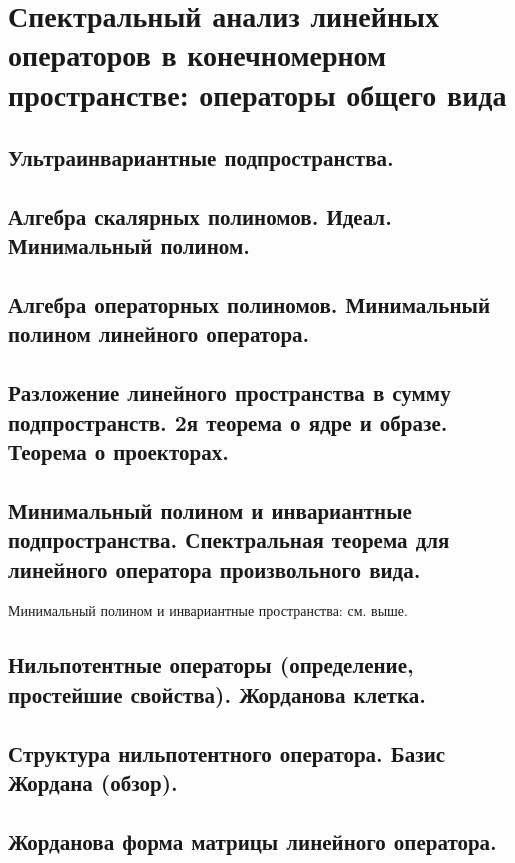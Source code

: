 \section{Спектральный анализ линейных операторов в конечномерном пространстве: операторы общего вида}

\subsection{Ультраинвариантные подпространства. }

\subsection{Алгебра скалярных полиномов. Идеал. Минимальный полином. }

\subsection{Алгебра операторных полиномов. Минимальный полином линейного оператора. }

\subsection{Разложение линейного пространства в сумму подпространств. 2я теорема о ядре и образе. Теорема о проекторах. }

\subsection{Минимальный полином и инвариантные подпространства. Спектральная теорема для линейного оператора произвольного
    вида.}
Минимальный полином и инвариантные пространства: см. выше.

\subsection{Нильпотентные операторы (определение, простейшие свойства). Жорданова клетка. }

\subsection{Структура нильпотентного оператора. Базис Жордана (обзор). }

\subsection{Жорданова форма матрицы линейного оператора. }

